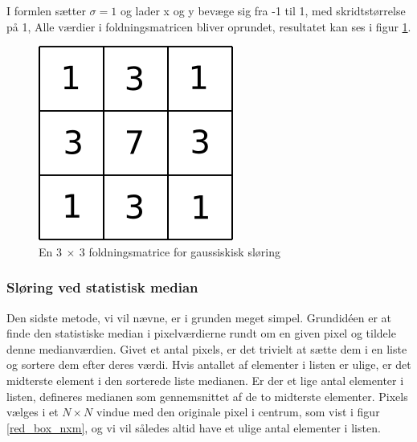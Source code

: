 {I formlen sætter $\sigma = 1$ og lader x og y bevæge sig fra -1 til 1, med skridtstørrelse på 1, Alle værdier i foldningsmatricen bliver oprundet, resultatet kan ses i figur \ref{gauss}.

\begin{figure}[h]
	\begin{center}
		\includegraphics[scale=0.5,angle=0]{afsnit/vores_implementation/billeder/sloering/gauss}
	\end{center}
	\caption[]{En $3~\times{}~3$ foldningsmatrice for gaussiskisk sløring}
	\label{gauss}
\end{figure}

\subsubsection{Sløring ved statistisk median}
Den sidste metode, vi vil nævne, er i grunden meget simpel. Grundidéen
er at finde den statistiske median i pixelværdierne rundt om en given
pixel og tildele denne medianværdien. Givet et antal pixels, er det
trivielt at sætte dem i en liste og sortere dem efter deres værdi. Hvis
antallet af elementer i listen er ulige, er det midterste element i den
sorterede liste medianen. Er der et lige antal elementer i listen,
defineres medianen som gennemsnittet af de to midterste elementer.
Pixels vælges i et $N \times N$ vindue med den originale pixel i
centrum, som vist i figur \ref{red_box_nxm}, og vi vil således altid
have et ulige antal elementer i listen.

}
